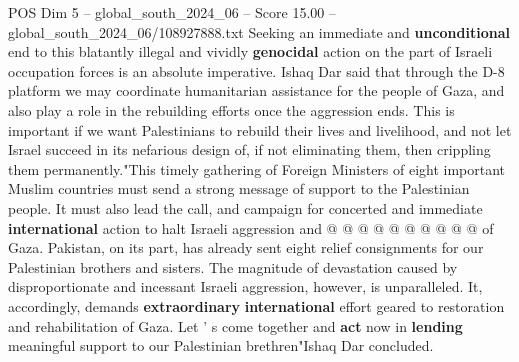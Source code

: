 \begin{textsample}{POS Dim 5 – global\_south\_2024\_06 – Score 15.00 – global\_south\_2024\_06/108927888.txt}
Seeking an immediate and \textbf{unconditional} end to this blatantly illegal and vividly \textbf{genocidal} action on the part of Israeli occupation forces is an absolute imperative.
Ishaq Dar said that through the D-8 platform we may coordinate humanitarian assistance for the people of Gaza, and also play a role in the rebuilding efforts once the aggression ends.
This is important if we want Palestinians to rebuild their lives and livelihood, and not let Israel succeed in its nefarious design of, if not eliminating them, then crippling them permanently."This timely gathering of Foreign Ministers of eight important Muslim countries must send a strong message of support to the Palestinian people.
It must also lead the call, and campaign for concerted and immediate \textbf{international} action to halt Israeli aggression and @ @ @ @ @ @ @ @ @ @ of Gaza.
Pakistan, on its part, has already sent eight relief consignments for our Palestinian brothers and sisters.
The magnitude of devastation caused by disproportionate and incessant Israeli aggression, however, is unparalleled.
It, accordingly, demands \textbf{extraordinary} \textbf{international} effort geared to restoration and rehabilitation of Gaza.
Let ' s come together and \textbf{act} now in \textbf{lending} meaningful support to our Palestinian brethren"Ishaq Dar concluded.

\end{textsample}
